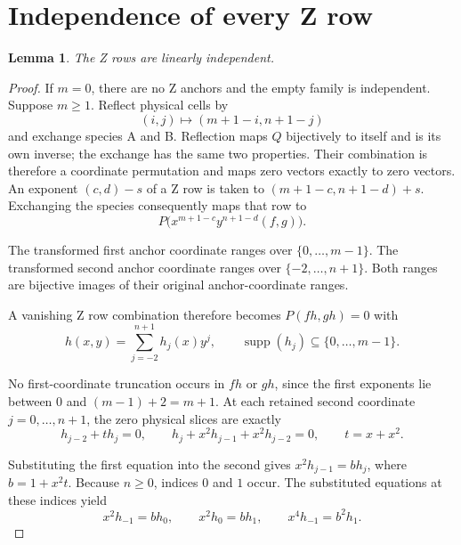\documentclass{article}
\newtheorem{lemma}{Lemma}
\begin{document}
\section{Independence of every Z row}\label{sec:z-independence}

\begin{lemma}\label{lem:z-independent}
The Z rows are linearly independent.
\end{lemma}

\begin{proof}
If \(m=0\), there are no Z anchors and the empty family is independent.
Suppose \(m\ge 1\). Reflect physical cells by
\begin{equation}\label{eq:reflection}
 (i,j)\longmapsto(m+1-i,n+1-j)
\end{equation}
and exchange species A and B. Reflection maps \(Q\) bijectively to itself and is
its own inverse; the exchange has the same two properties. Their combination
is therefore a coordinate permutation and maps zero vectors exactly to zero
vectors. An exponent \((c,d)-s\) of a Z row is taken to
\((m+1-c,n+1-d)+s\). Exchanging the species consequently maps that row to
\begin{equation}\label{eq:reflected-row}
 P\bigl(x^{m+1-c}y^{n+1-d}(f,g)\bigr).
\end{equation}

The transformed first anchor coordinate ranges over \(\{0,\ldots,m-1\}\). The
transformed second anchor coordinate ranges over \(\{-2,\ldots,n+1\}\). Both ranges
are bijective images of their original anchor-coordinate ranges.

A vanishing Z row combination therefore becomes \(P(fh,gh)=0\) with
\begin{equation}\label{eq:z-anchor-polynomial}
 h(x,y)=\sum_{j=-2}^{n+1}h_j(x)y^j,
 \qquad \operatorname{supp}(h_j)\subseteq\{0,\ldots,m-1\}.
\end{equation}

No first-coordinate truncation occurs in \(fh\) or \(gh\), since the first
exponents lie between \(0\) and \((m-1)+2=m+1\). At each retained second coordinate
\(j=0,\ldots,n+1\), the zero physical slices are exactly
\begin{equation}\label{eq:rank-z}
 h_{j-2}+t h_j=0,
 \qquad h_j+x^2h_{j-1}+x^2h_{j-2}=0,
 \qquad t=x+x^2.
\end{equation}

Substituting the first equation into the second gives
\(x^2h_{j-1}=b h_j\), where \(b=1+x^2t\). Because \(n\ge 0\), indices \(0\) and \(1\)
occur. The substituted equations at these indices yield
\begin{equation}\label{eq:z-initial}
 x^2h_{-1}=b h_0,
 \qquad x^2h_0=b h_1,
 \qquad x^4h_{-1}=b^2h_1.
\end{equation}


\end{proof}
\end{document}
